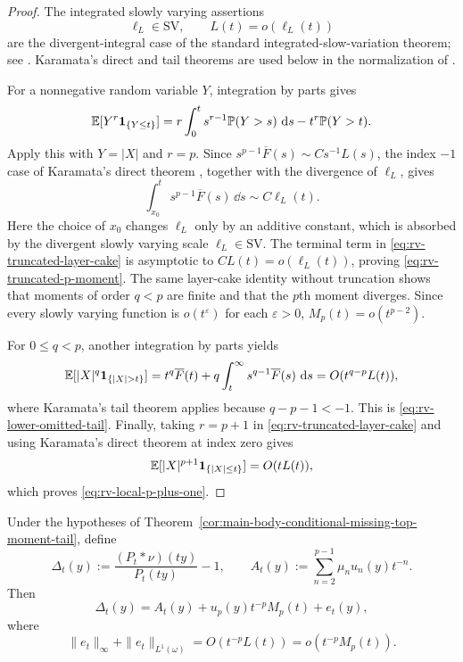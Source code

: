 \begin{proof}
The integrated slowly varying assertions
\[
 \ell_L\in\mathrm{SV},\qquad L(t)=o(\ell_L(t))
\]
are the divergent-integral case of the standard integrated-slow-variation
theorem; see
\cite[Proposition~1.5.9a]{BinghamGoldieTeugels1987RegularVariation}.
Karamata's direct and tail theorems are used below in the normalization of
\cite[Theorem~1.5.11]{BinghamGoldieTeugels1987RegularVariation}.

For a nonnegative random variable \(Y\), integration by parts gives
\begin{equation}\label{eq:rv-truncated-layer-cake}
 \mathbb{E}[Y^r\mathbf1_{\{Y\le t\}}]
 =r\int_0^t s^{r-1}\mathbb P(Y>s)\,\,\mathrm{d} s
 -t^r\mathbb P(Y>t).
\end{equation}
Apply this with \(Y=|X|\) and \(r=p\).  Since
\(s^{p-1}\overline F(s)\sim Cs^{-1}L(s)\), the index \(-1\) case of
Karamata's direct theorem
\cite[Theorem~1.5.11]{BinghamGoldieTeugels1987RegularVariation}, together
with the divergence of \(\ell_L\), gives
\[
 \int_{x_0}^t s^{p-1}\overline F(s)\,\dd s
 \sim C\ell_L(t).
\]
Here the choice of \(x_0\) changes \(\ell_L\) only by an additive constant,
which is absorbed by the divergent slowly varying scale
\(\ell_L\in\mathrm{SV}\).
The terminal term in \eqref{eq:rv-truncated-layer-cake} is asymptotic to
\(CL(t)=o(\ell_L(t))\), proving
\eqref{eq:rv-truncated-p-moment}.  The same layer-cake identity without
truncation shows that moments of order \(q<p\) are finite and that the
\(p\)th moment diverges.  Since every slowly varying function is
\(o(t^\varepsilon)\) for each \(\varepsilon>0\),
\(M_p(t)=o(t^{p-2})\).

For \(0\le q<p\), another integration by parts yields
\[
 \EE[|X|^q\mathbf1_{\{|X|>t\}}]
 =t^q\overline F(t)
 +q\int_t^\infty s^{q-1}\overline F(s)\,\dd s
 =O(t^{q-p}L(t)),
\]
where Karamata's tail theorem applies because \(q-p-1<-1\).  This is
\eqref{eq:rv-lower-omitted-tail}.  Finally, taking \(r=p+1\) in
\eqref{eq:rv-truncated-layer-cake} and using Karamata's direct theorem at
index zero gives
\[
 \mathbb{E}[|X|^{p+1}\mathbf1_{\{|X|\le t\}}]=O(tL(t)),
\]
which proves \eqref{eq:rv-local-p-plus-one}.
\end{proof}

\begin{lemma}%
\label{lem:rv-boundary-quotient-jet}
Under the hypotheses of
Theorem~\ref{cor:main-body-conditional-missing-top-moment-tail}, define
\[
 \Delta_t(y):=\frac{(P_t*\nu)(ty)}{P_t(ty)}-1,\qquad
 A_t(y):=\sum_{n=2}^{p-1}\mu_nu_n(y)t^{-n}.
\]
Then
\begin{equation}\label{eq:rv-boundary-quotient-jet}
 \Delta_t(y)=A_t(y)+u_p(y)t^{-p}M_p(t)+e_t(y),
\end{equation}
where
\begin{equation}\label{eq:rv-boundary-quotient-error}
 \|e_t\|_\infty+\|e_t\|_{L^1(\omega)}
 =O(t^{-p}L(t))
 =o(t^{-p}M_p(t)).
\end{equation}
\end{lemma}

